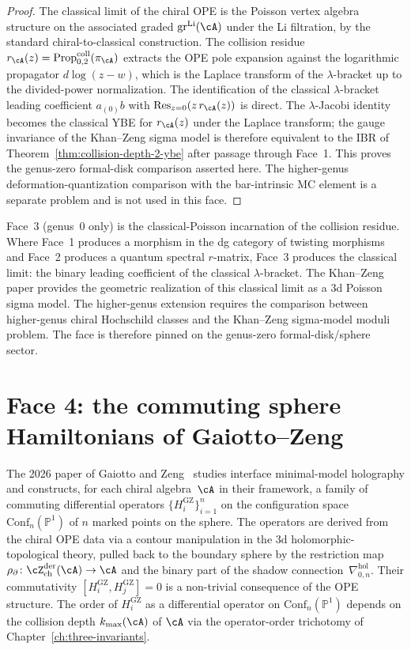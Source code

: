 \begin{proof}
The classical limit of the chiral OPE is the Poisson vertex algebra
structure on the associated graded $\mathrm{gr}^{\mathrm{Li}}(\cA)$
under the Li filtration, by the standard chiral-to-classical
construction. The collision residue
$r_\cA(z)=\operatorname{Prop}^{\mathrm{coll}}_{0,2}(\pi_\cA)$
extracts the OPE pole expansion against the
logarithmic propagator $d\log(z-w)$, which is the Laplace transform
of the $\lambda$-bracket up to the divided-power normalization. The
identification of the classical $\lambda$-bracket leading coefficient
$a_{(0)}b$ with $\mathrm{Res}_{z=0}(z\, r_\cA(z))$ is direct. The
$\lambda$-Jacobi identity becomes the classical YBE for $r_\cA(z)$
under the Laplace transform; the gauge invariance of the
Khan--Zeng sigma model is therefore equivalent to the IBR of
Theorem~\ref{thm:collision-depth-2-ybe} after passage through
Face~1. This proves the genus-zero formal-disk comparison asserted
here. The higher-genus deformation-quantization comparison with the
bar-intrinsic MC element is a separate problem and is not used in
this face.
\end{proof}

Face~3 \textup{(}genus~$0$ only\textup{)} is the classical-Poisson incarnation of the collision
residue. Where Face~1 produces a morphism in the dg category of
twisting morphisms and Face~2 produces a quantum spectral $r$-matrix,
Face~3 produces the classical limit: the binary leading coefficient
of the classical $\lambda$-bracket. The Khan--Zeng paper provides
the geometric realization of this classical limit as a 3d Poisson
sigma model. The higher-genus extension requires the comparison between
higher-genus chiral Hochschild classes and the Khan--Zeng sigma-model
moduli problem. The face is therefore pinned on the genus-zero
formal-disk/sphere sector.

\section{Face 4: the commuting sphere Hamiltonians of Gaiotto--Zeng}
\label{sec:hdm-face-4}

The 2026 paper of Gaiotto and Zeng~\cite{GZ26} studies interface
minimal-model holography and constructs, for each chiral algebra~$\cA$
in their framework, a family of commuting differential operators
$\{H_i^{\mathrm{GZ}}\}_{i=1}^n$ on the configuration space
$\mathrm{Conf}_n(\mathbb{P}^1)$ of $n$ marked points on the sphere.
The operators are derived from the chiral OPE data via a contour
manipulation in the $3$d holomorphic-topological theory, pulled back to
the boundary sphere by the restriction map
$\rho_{\partial}\colon \cZ^{\mathrm{der}}_{\mathrm{ch}}(\cA)\to \cA$ and
the binary part of the shadow connection~$\nabla^{\mathrm{hol}}_{0,n}$.
Their commutativity
$[H_i^{\mathrm{GZ}}, H_j^{\mathrm{GZ}}] = 0$ is a non-trivial
consequence of the OPE structure. The order of $H_i^{\mathrm{GZ}}$
as a differential operator on $\mathrm{Conf}_n(\mathbb{P}^1)$
depends on the collision depth $k_{\max}(\cA)$ of $\cA$ via the
operator-order trichotomy of Chapter~\ref{ch:three-invariants}.

